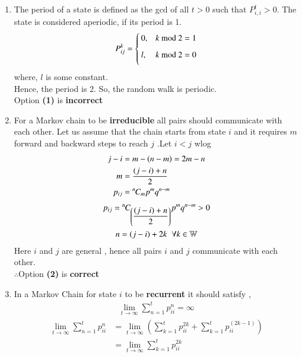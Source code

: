 \documentclass[journal,12pt,twocolumn]{IEEEtran}
\begin{document}
\begin{enumerate}
\item The period of a state is defined as the gcd of all $t > 0$ such that $P_{i,i}^{t} > 0$. The state is considered aperiodic, if its period is 1.
\begin{equation}
 P_{ij}^{k} =\begin{cases}
  0 , &k\text{ mod }2 = 1\vspace{0.2cm}\\
  l, &k\text{ mod }2 = 0\vspace{0.2cm}\\
  \end{cases}
\end{equation}
where, $l$ is some constant.\\
Hence, the period is 2. So, the random walk is periodic.\\
Option \textbf{(1)} is \textbf{incorrect}
\item For a Markov chain to be \textbf{irreducible} all pairs  should communicate with each other. Let us assume that the chain starts from state $i$ and it requires $m$ forward and  backward steps to reach $j$ .Let $i < j$ wlog 
\begin{align}
j - i &= m - (n - m) = 2m - n\\
m &= \frac{(j - i) + n}{2}\\
p_{ij} &= {{}^{n}\mkern-1muC_{m}} p^m q^{n-m}
\end{align}
\begin{multline}
p_{ij} = {{}^{n}\mkern-1muC_{\left(\dfrac{(j - i) + n}{2}\right)}} p^m q^{n-m} > 0\\
 n = (j-i)+2k \hspace{0.2cm} \forall k \in \mathbb{W}
\end{multline}
Here $i$ and $j$ are general , hence all pairs $i$ and $j$ communicate with each other.\\
$\therefore$Option \textbf{(2)} is \textbf{correct}
\item In a Markov Chain for state $i$ to be \textbf{recurrent} it should satisfy ,
\begin{align}
\lim_{t \to \infty} \sum_{n=1}^{t} p^n_{ii} = \infty \label{eq:Recurrent}
\end{align}
\begin{align}
\lim_{t \to \infty} \sum_{n=1}^{t} p^n_{ii} &= \lim_{t \to \infty}\left(\sum_{k=1}^{t} p^{2k}_{ii} + \sum_{k=1}^{t} p^{(2k-1)}_{ii}\right)\\
&= \lim_{t \to \infty}\sum_{k=1}^{t} p^{2k}_{ii}\\

\end{align}
\end{enumerate}
\end{document}
